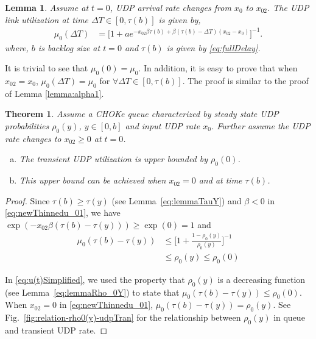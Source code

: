\documentclass{IEEEtran}
\newtheorem{lemma}{Lemma}
\begin{document}
 \begin{lemma}\label{eq:udpTranUtil}
 Assume at $t=0$, UDP arrival rate changes from $x_0$ to $x_{02}$. The UDP link utilization at time $\Delta T \in[0,\tau(b)]$  is given by, \begin{align}\nonumber
        \mu_0(\Delta T)&=\bigg[1+ae^{-x_{02}\beta \tau(b)+\beta (\tau(b)-\Delta T)(x_{02}-x_0)} \bigg]^{-1}.
     \end{align}
     where, $b$ is backlog size at $t=0$ and $\tau(b)$ is given by \eqref{eq:fullDelay}.
 \end{lemma}

    It is trivial to see that $\mu_0(0)=\mu_0$. In addition, it is easy to prove that when $x_{02}=x_0$, $\mu_0(\Delta T)=\mu_0$ for $\forall \Delta T \in [0,\tau(b)]$. The proof is similar to the proof of Lemma \ref{lemma:alpha1}.

    \newtheorem{theorem}{Theorem}
    \begin{theorem}\label{eq:Thorem_maxu(t)_0}
       Assume a CHOKe queue characterized by steady state UDP probabilities $\rho_0(y)$, $y\in[0,b]$ and input UDP rate $x_0$. Further assume the UDP rate changes to $x_{02}\geq 0$ at $t=0$.
        \begin{enumerate}[(a)]
          \item The transient UDP utilization is upper bounded by $\rho_0(0)$.
          \item This upper bound can be achieved when $x_{02}=0$ and at time $\tau(b)$.
        \end{enumerate}
    \end{theorem}

    \begin{proof}
      Since $\tau(b)\geqslant \tau(y)$ (see Lemma~\ref{eq:lemmaTauY}) and $\beta <0$ in \eqref{eq:newThinnedu_01}, we have $\exp(-x_{02}\beta(\tau(b)-\tau(y)))
      \geqslant \exp(0)=1$ and
      \begin{align}\label{eq:u(t)Simplified}
        \mu_0(\tau(b)-\tau(y)) & \leqslant \bigg[1+\frac{1-\rho_0(y)}{\rho_0(y)} \bigg]^{-1} \nonumber \\
                                   &\leqslant  \rho_0(y) \leqslant \rho_0(0)
      \end{align}

      In \eqref{eq:u(t)Simplified}, we used the property that $\rho_0(y)$ is a decreasing function (see Lemma~\ref{eq:lemmaRho_0Y}) to state that $\mu_0(\tau(b)-\tau(y))\leqslant \rho_0(0)$.
      When $x_{02}=0$ in \eqref{eq:newThinnedu_01}, $\mu_0(\tau(b)-\tau(y)) = \rho_0(y)$. See Fig.~\ref{fig:relation-rho0(y)-udpTran} for the relationship between $\rho_0(y)$ in queue and transient UDP rate.
    \end{proof}
\end{document}
